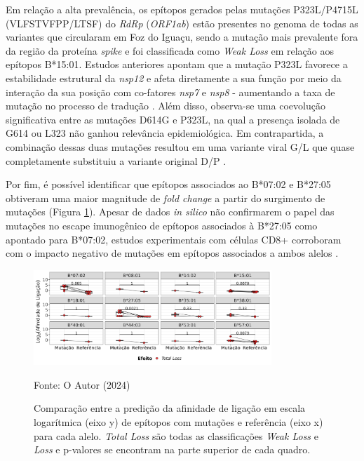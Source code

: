 \begin{justifying}
Em relação a alta prevalência, os epítopos gerados pelas mutações P323L/P4715L (VLFSTVFPP/LTSF) do \textit{RdRp} (\textit{ORF1ab}) estão presentes no genoma de todas as variantes que circularam em Foz do Iguaçu, sendo a mutação mais prevalente fora da região da proteína \textit{spike} e foi classificada como \textit{Weak Loss} em relação aos epítopos B*15:01. Estudos anteriores apontam que a mutação P323L favorece a estabilidade estrutural da \textit{nsp12} e afeta diretamente a sua função por meio da interação da sua posição com co-fatores \textit{nsp7} e \textit{nsp8} - aumentando a taxa de mutação no processo de tradução \cite{Kim:2023, kirchdoerfer:2019}. Além disso, observa-se uma coevolução significativa entre as mutações D614G e P323L, na qual a presença isolada de G614 ou L323 não ganhou relevância epidemiológica. Em contrapartida, a combinação dessas duas mutações resultou em uma variante viral G/L que quase completamente substituiu a variante original D/P \cite{Ilmjarv:2021}.

Por fim, é possível identificar que epítopos associados ao B*07:02 e B*27:05 obtiveram uma maior magnitude de \textit{fold change} a partir do surgimento de mutações (Figura \ref{fig:fig11}). Apesar de dados \textit{in silico} não confirmarem o papel das mutações no escape imunogênico de epítopos associados à B*27:05 como apontado para B*07:02, estudos experimentais com células CD8+ corroboram com o impacto negativo de mutações em epítopos associados a ambos alelos \cite{Wellington:2023}. 

\begin{figure}
    \centering
    \caption{\justifying Comparação entre a predição da afinidade de ligação em escala logarítmica (eixo y) de epítopos com mutações e referência (eixo x) para cada alelo. \textit{Total Loss} são todas as classificações \textit{Weak Loss} e \textit{Loss} e p-valores se encontram na parte superior de cada quadro.}
    \includegraphics[width=0.8\textwidth, height=0.4\textwidth]{Figuras/fig11.png}
    \label{fig:fig11}
    \begin{minipage}{0.8\textwidth} %
        \centering
        \footnotesize Fonte: O Autor (2024)
    \end{minipage}
\end{figure}


\end{justifying}
